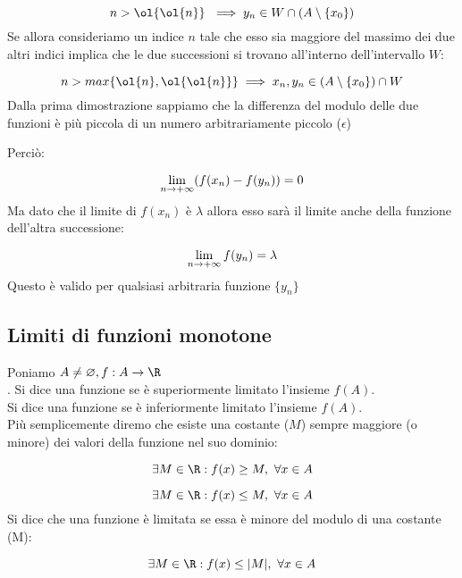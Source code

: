\documentclass[../analisi.tex]{subfiles}
\begin{document}
\begin{dimo}
\begin{enumerate}
	\begin{equation}
		n > \ol{\ol{n}}\ \implies y_n \in W \cap (A \setminus \{x_0\})
	\end{equation}
	Se allora consideriamo un indice $n$ tale che esso sia maggiore del
	massimo dei due altri indici implica che le due successioni si trovano
	all'interno dell'intervallo $W$:

	\begin{equation}
		n > max\{ \ol{n}, \ol{\ol{n}} \} \implies
		x_n, y_n \in (A \setminus \{ x_0 \} ) \cap W
	\end{equation}
	Dalla prima dimostrazione sappiamo che la differenza del modulo delle 
	due funzioni è più piccola di un numero arbitrariamente piccolo ($\epsilon$)

	Perciò:

	\begin{equation}
		\lim \limits_{n \to + \infty} ( f (x_n) - f(y_n) ) = 0
	\end{equation}
	Ma dato che il limite di $f(x_n)$ è $\lambda$ allora esso sarà
	il limite anche della funzione dell'altra successione:

	\begin{equation}
		\lim \limits_{n \to + \infty} f(y_n) = \lambda
	\end{equation}
	Questo è valido per qualsiasi arbitraria funzione $\{y_n\}$
\end{enumerate}
\end{dimo}


\subsection{Limiti di funzioni monotone}%
\label{sub:limiti_di_funzioni_monotone}



\begin{defn}
Poniamo $A \neq \varnothing, f: A \to \R$\\.
Si dice una funzione  se è superiormente
limitato l'insieme $f(A)$.\\
Si dice una funzione  se è inferiormente
limitato l'insieme $f(A)$.\\
Più semplicemente diremo che esiste una costante ($M$) sempre maggiore (o minore)
dei valori della funzione nel suo dominio:

\begin{equation}
	\exists M \in \R: f(x) \geq M,\ \forall x \in A
\end{equation}

\begin{equation}
	\exists M \in \R: f(x) \leq M,\ \forall x \in A
\end{equation}
Si dice che una funzione è limitata se essa è minore del modulo di una costante
(M):

\begin{equation}
	\exists M \in \R: f(x) \leq |M|,\ \forall x \in A
\end{equation}


\end{defn}
\end{document}
